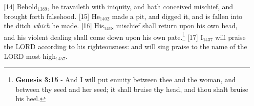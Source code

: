 [14] \textcolor[cmyk]{0.99998,1,0,0}{Behold\textcolor{jungle}{$_{1389}$}, he travaileth with iniquity, and hath conceived mischief, and brought forth falsehood.}
[15] \textcolor[cmyk]{0.99998,1,0,0}{He\textcolor{jungle}{$_{1402}$} made a pit, and digged it, and is fallen into the ditch \emph{which} he made.}
[16] \textcolor[cmyk]{0.99998,1,0,0}{His\textcolor{jungle}{$_{1418}$} mischief shall return upon his own head, and his violent dealing shall come down upon his own pate.}\footnote{\textbf{Genesis 3:15} - And I will put enmity between thee and the woman, and between thy seed and her seed; it shall bruise thy head, and thou shalt bruise his heel.}
[17] \textcolor[cmyk]{0.99998,1,0,0}{I\textcolor{jungle}{$_{1437}$} will praise the LORD according to his righteousness: and will sing praise to the name of the LORD most high\textcolor{jungle}{$_{1457}$}.}


